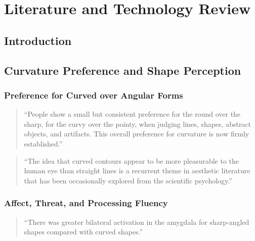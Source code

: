 \chapter{Literature and Technology Review}

\section{Introduction}


\section{Curvature Preference and Shape Perception}
\subsection{Preference for Curved over Angular Forms}
\begin{quote}
``People show a small but consistent preference for the round over the sharp, for the curvy over the pointy, when judging lines, shapes, abstract objects, and artifacts. This overall preference for curvature is now firmly established.''
\end{quote}
\citep{cotter_curve_2017}

\begin{quote}
``The idea that curved contours appear to be more pleasurable to the human eye than straight lines is a recurrent theme in aesthetic literature that has been occasionally explored from the scientific psychology.''
\end{quote}
\citep{gomez-puerto_preference_2016}

\subsection{Affect, Threat, and Processing Fluency}
\begin{quote}
``There was greater bilateral activation in the amygdala for sharp-angled shapes compared with curved shapes.''
\end{quote}
\citep{bar_visual_2007}

